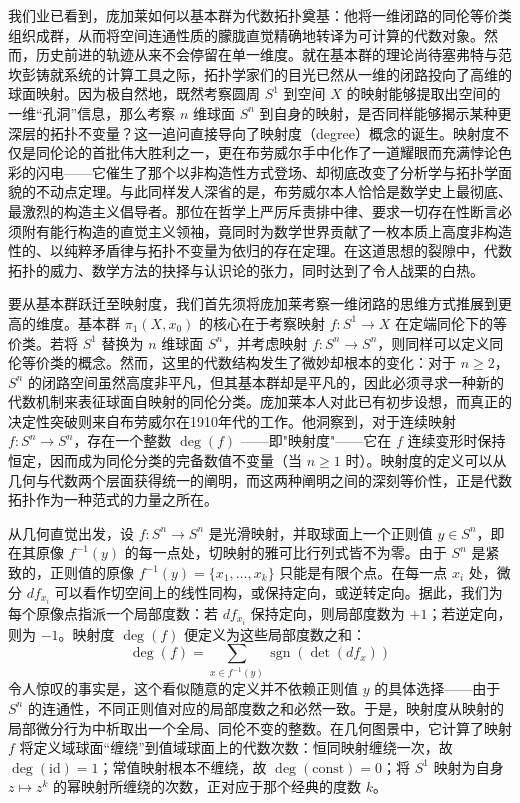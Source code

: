 \documentclass[12pt,a4paper]{article}
\begin{document}
我们业已看到，庞加莱如何以基本群为代数拓扑奠基：他将一维闭路的同伦等价类组织成群，从而将空间连通性质的朦胧直觉精确地转译为可计算的代数对象。然而，历史前进的轨迹从来不会停留在单一维度。就在基本群的理论尚待塞弗特与范坎彭铸就系统的计算工具之际，拓扑学家们的目光已然从一维的闭路投向了高维的球面映射。因为极自然地，既然考察圆周 $S^1$ 到空间 $X$ 的映射能够提取出空间的一维“孔洞”信息，那么考察 $n$ 维球面 $S^n$ 到自身的映射，是否同样能够揭示某种更深层的拓扑不变量？这一追问直接导向了映射度（degree）概念的诞生。映射度不仅是同伦论的首批伟大胜利之一，更在布劳威尔手中化作了一道耀眼而充满悖论色彩的闪电——它催生了那个以非构造性方式登场、却彻底改变了分析学与拓扑学面貌的不动点定理。与此同样发人深省的是，布劳威尔本人恰恰是数学史上最彻底、最激烈的构造主义倡导者。那位在哲学上严厉斥责排中律、要求一切存在性断言必须附有能行构造的直觉主义领袖，竟同时为数学世界贡献了一枚本质上高度非构造性的、以纯粹矛盾律与拓扑不变量为依归的存在定理。在这道思想的裂隙中，代数拓扑的威力、数学方法的抉择与认识论的张力，同时达到了令人战栗的白热。

要从基本群跃迁至映射度，我们首先须将庞加莱考察一维闭路的思维方式推展到更高的维度。基本群 $\pi_1(X, x_0)$ 的核心在于考察映射 $f: S^1 \to X$ 在定端同伦下的等价类。若将 $S^1$ 替换为 $n$ 维球面 $S^n$，并考虑映射 $f: S^n \to S^n$，则同样可以定义同伦等价类的概念。然而，这里的代数结构发生了微妙却根本的变化：对于 $n \ge 2$，$S^n$ 的闭路空间虽然高度非平凡，但其基本群却是平凡的，因此必须寻求一种新的代数机制来表征球面自映射的同伦分类。庞加莱本人对此已有初步设想，而真正的决定性突破则来自布劳威尔在1910年代的工作。他洞察到，对于连续映射 $f: S^n \to S^n$，存在一个整数 $\deg(f)$ ——即"映射度"——它在 $f$ 连续变形时保持恒定，因而成为同伦分类的完备数值不变量（当 $n \ge 1$ 时）。映射度的定义可以从几何与代数两个层面获得统一的阐明，而这两种阐明之间的深刻等价性，正是代数拓扑作为一种范式的力量之所在。

从几何直觉出发，设 $f: S^n \to S^n$ 是光滑映射，并取球面上一个正则值 $y \in S^n$，即在其原像 $f^{-1}(y)$ 的每一点处，切映射的雅可比行列式皆不为零。由于 $S^n$ 是紧致的，正则值的原像 $f^{-1}(y) = \{x_1, \dots, x_k\}$ 只能是有限个点。在每一点 $x_i$ 处，微分 $df_{x_i}$ 可以看作切空间上的线性同构，或保持定向，或逆转定向。据此，我们为每个原像点指派一个局部度数：若 $df_{x_i}$ 保持定向，则局部度数为 $+1$；若逆定向，则为 $-1$。映射度 $\deg(f)$ 便定义为这些局部度数之和：
$$
\deg(f) = \sum_{x \in f^{-1}(y)} \operatorname{sgn}(\det(df_x))
$$
令人惊叹的事实是，这个看似随意的定义并不依赖正则值 $y$ 的具体选择——由于 $S^n$ 的连通性，不同正则值对应的局部度数之和必然一致。于是，映射度从映射的局部微分行为中析取出一个全局、同伦不变的整数。在几何图景中，它计算了映射 $f$ 将定义域球面“缠绕”到值域球面上的代数次数：恒同映射缠绕一次，故 $\deg(\text{id}) = 1$；常值映射根本不缠绕，故 $\deg(\text{const}) = 0$；将 $S^1$ 映射为自身 $z \mapsto z^k$ 的幂映射所缠绕的次数，正对应于那个经典的度数 $k$。
\end{document}
